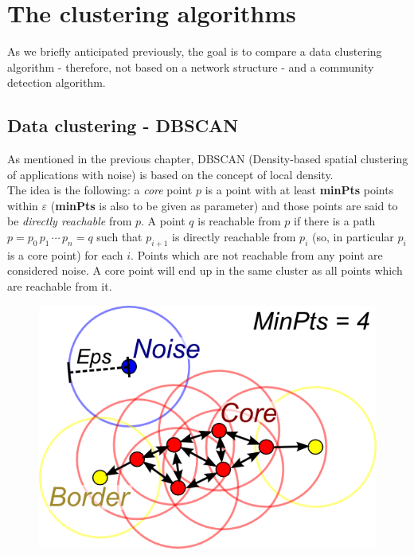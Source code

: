 \documentclass[a4paper,11pt]{book}
\begin{document}
\section{The clustering algorithms}
As we briefly anticipated previously, the goal is to compare a data clustering algorithm - therefore, not based on a network structure - and a community detection algorithm.
\subsection{Data clustering - DBSCAN}
As mentioned in the previous chapter, DBSCAN (Density-based spatial clustering of applications with noise) is based on the concept of local density.\\
 The idea is the following: a \textit{core} point $p$ is a point with at least \textbf{minPts}  points within $\varepsilon$ (\textbf{minPts} is also to be given as parameter) and those points are said to be \textit{directly reachable} from $p$. A point $q$ is reachable from $p$ if there is a path $p=p_0\,p_1\,\cdots\,p_n=q$ such that $p_{i+1}$ is directly reachable from $p_i$ (so, in particular $p_i$ is a core point) for each $i$. Points which are not reachable from any point are considered noise. A core point will end up in the same cluster as all points which are reachable from it.
 \vspace{5mm}
 \begin{figure}
 \centering
\includegraphics[scale=1.2]{DBSCAN.png}
\end{figure}
\end{document}
